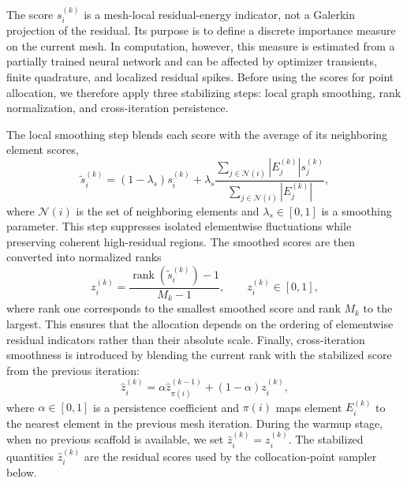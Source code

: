 \begin{remark}
The score $s_i^{(k)}$ is a mesh-local residual-energy indicator, not a
Galerkin projection of the residual.  Its purpose is to define a discrete
importance measure on the current mesh.  In computation, however, this measure
is estimated from a partially trained neural network and can be affected by
optimizer transients, finite quadrature, and localized residual spikes.  Before
using the scores for point allocation, we therefore apply three stabilizing
steps: local graph smoothing, rank normalization, and cross-iteration
persistence.

The local smoothing step blends each score with the average of
its neighboring element scores,
\begin{equation}
    \tilde{s}_i^{(k)}
    =
    (1-\lambda_s)s_i^{(k)}
    +
    \lambda_s
    \frac{\sum_{j\in\mathcal{N}(i)} |E_j^{(k)}|s_j^{(k)}}
         {\sum_{j\in\mathcal{N}(i)} |E_j^{(k)}|},
    \label{eq:score-smoothing}
\end{equation}
where $\mathcal{N}(i)$ is the set of neighboring elements and
$\lambda_s\in[0,1]$ is a smoothing parameter.  This step suppresses isolated
elementwise fluctuations while preserving coherent high-residual regions.  The
smoothed scores are then converted into normalized ranks
\begin{equation}
    z_i^{(k)}
    =
    \frac{
        \operatorname{rank}\!\left(\tilde{s}_i^{(k)}\right)-1
    }{
        M_k-1
    },
    \qquad
    z_i^{(k)}\in[0,1],
    \label{eq:normalized-rank}
\end{equation}
where rank one corresponds to the smallest smoothed score and rank $M_k$ to the
largest.  This ensures that the allocation depends on the ordering of
elementwise residual indicators rather than their absolute scale.  Finally,
cross-iteration smoothness is introduced by blending the current rank with the
stabilized score from the previous iteration:
\begin{equation}
    \hat{z}_i^{(k)}
    =
    \alpha \hat{z}_{\pi(i)}^{(k-1)}
    +
    (1-\alpha) z_i^{(k)},
    \label{eq:rank-persistent-score}
\end{equation}
where $\alpha\in[0,1]$ is a persistence coefficient and $\pi(i)$ maps element
$E_i^{(k)}$ to the nearest element in the previous mesh iteration.  During
the warmup stage, when no previous scaffold is available, we set
$\hat{z}_i^{(k)}=z_i^{(k)}$.  The stabilized quantities
$\hat{z}_i^{(k)}$ are the residual scores used by the collocation-point sampler
below.
\end{remark}

